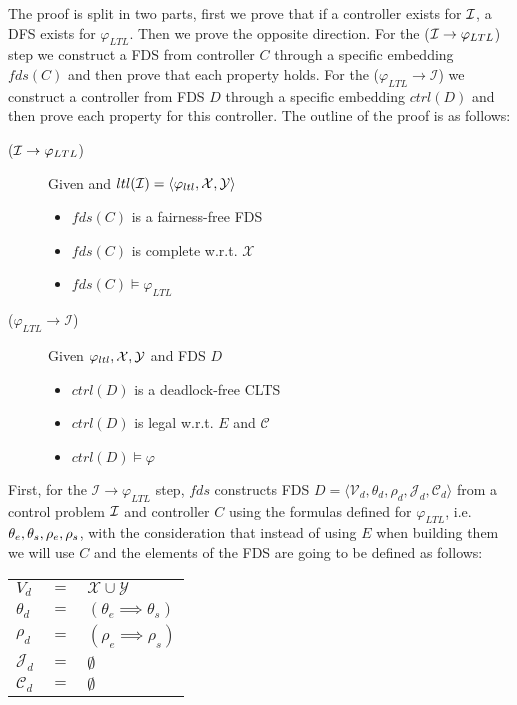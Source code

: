 The proof is split in two parts, first we prove that if a controller exists for ${\mathcal{I}}$, a DFS exists for $\varphi_{LTL}$. Then we prove the opposite direction. For the (${\mathcal{I}} \rightarrow \varphi_{LTL}$) step we construct a FDS from controller $C$ through a specific embedding $fds(C)$ and then prove that each property holds. For the ($\varphi_{LTL} \rightarrow \mathcal{I}$) we construct a controller from FDS $D$ through a specific embedding $ctrl(D)$ and then prove each property for this controller. The outline of the proof is as follows:

\begin{description}
	\item[(${\mathcal{I}} \rightarrow \varphi_{LTL}$)] Given \controlProblemDef and $ltl({\mathcal{I}}) = \langle \varphi_{ltl}, {\mathcal{X}}, {\mathcal{Y}}\rangle$
		\begin{itemize}
			\item $fds(C)$ is a fairness-free FDS			
			\item $fds(C)$ is complete w.r.t. $\mathcal{X}$
			\item $fds(C) \models \varphi_{LTL}$
		\end{itemize}
	\item[($\varphi_{LTL} \rightarrow \mathcal{I}$)] Given $\varphi_{ltl}, {\mathcal{X}}, {\mathcal{Y}}$ and FDS $D$
		\begin{itemize}
			\item $ctrl(D)$ is a deadlock-free CLTS			
			\item $ctrl(D)$ is legal w.r.t. $E$ and $\mathcal{C}$
			\item $ctrl(D) \models \varphi$
		\end{itemize}	
\end{description}

First,  for the $\mathcal{I} \rightarrow \varphi_{LTL}$ step, $fds$ constructs FDS $D=\langle \mathcal V_d, \theta_d, \rho_d, \mathcal{J}_d, \mathcal{C}_d \rangle$ from a control problem ${\mathcal{I}}$ and controller $C$ using the formulas defined for $\varphi_{LTL}$, i.e. ${\theta_e}, {\theta_s}, {\rho_e}, {\rho_s}$, with the consideration that instead of using $E$ when building them we will use $C$ and the elements of the FDS are going to be defined as follows:

	\begin{tabular}{ l c l }
	$V_d$ & $=$ & $\mathcal{X} \cup \mathcal{Y}$\\	
	$\theta_d$ & $=$ & $(\theta_e \implies \theta_s)$\\
	$\rho_d$ & $=$ & $(\rho_e \implies \rho_s)$\\	
	$\mathcal{J}_d$ & $=$ & $\emptyset$\\
	$\mathcal{C}_d$ & $=$ & $\emptyset$\\
\end{tabular}

